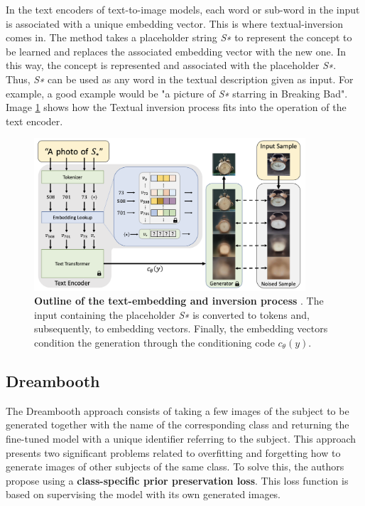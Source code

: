 In the text encoders of text-to-image models, each word or sub-word in the input is associated with a unique embedding vector. This is where textual-inversion comes in. The method takes a placeholder string \textit{S∗} to represent the concept to be learned and replaces the associated embedding vector with the new one. In this way, the concept is represented and associated with the placeholder \textit{S∗}. Thus, \textit{S∗} can be used as any word in the textual description given as input. For example, a good example would be "a picture of \textit{S∗} starring in Breaking Bad". Image \ref{fig:textualI} shows how the Textual inversion process fits into the operation of the text encoder.

\begin{figure}
    \centering
    \includegraphics[width=0.9\textwidth]{Pictures/textualI.png} 
    \caption{\textbf{Outline of the text-embedding and inversion process} \cite{gal2022image}. The input containing the placeholder \textit{S∗} is converted to tokens and, subsequently, to embedding vectors. Finally, the embedding vectors condition the generation through the conditioning code $c_{\theta }(y)$.}
    \label{fig:textualI}
\end{figure}

\subsection{Dreambooth}

The Dreambooth approach consists of taking a few images of the subject to be generated together with the name of the corresponding class and returning the fine-tuned model with a unique identifier referring to the subject. This approach presents two significant problems related to overfitting and forgetting how to generate images of other subjects of the same class. To solve this, the authors propose using a \textbf{class-specific prior preservation loss}. This loss function is based on supervising the model with its own generated images.


